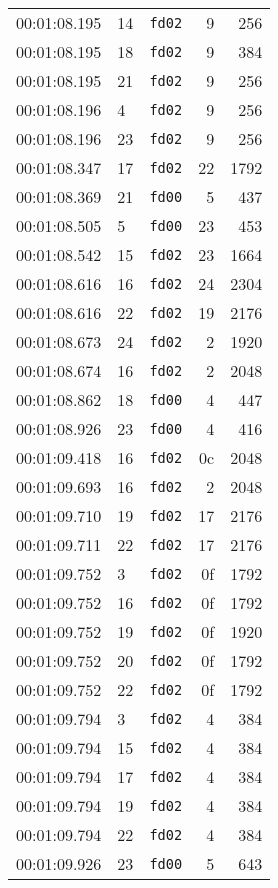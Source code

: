 \documentclass{article}
\begin{document}
\begin{longtable}{lllrr}
00:01:08.195 & 14 & \texttt{fd02} & 9 & 256 \\
00:01:08.195 & 18 & \texttt{fd02} & 9 & 384 \\
00:01:08.195 & 21 & \texttt{fd02} & 9 & 256 \\
00:01:08.196 & 4 & \texttt{fd02} & 9 & 256 \\
00:01:08.196 & 23 & \texttt{fd02} & 9 & 256 \\
00:01:08.347 & 17 & \texttt{fd02} & 22 & 1792 \\
00:01:08.369 & 21 & \texttt{fd00} & 5 & 437 \\
00:01:08.505 & 5 & \texttt{fd00} & 23 & 453 \\
00:01:08.542 & 15 & \texttt{fd02} & 23 & 1664 \\
00:01:08.616 & 16 & \texttt{fd02} & 24 & 2304 \\
00:01:08.616 & 22 & \texttt{fd02} & 19 & 2176 \\
00:01:08.673 & 24 & \texttt{fd02} & 2 & 1920 \\
00:01:08.674 & 16 & \texttt{fd02} & 2 & 2048 \\
00:01:08.862 & 18 & \texttt{fd00} & 4 & 447 \\
00:01:08.926 & 23 & \texttt{fd00} & 4 & 416 \\
00:01:09.418 & 16 & \texttt{fd02} & 0c & 2048 \\
00:01:09.693 & 16 & \texttt{fd02} & 2 & 2048 \\
00:01:09.710 & 19 & \texttt{fd02} & 17 & 2176 \\
00:01:09.711 & 22 & \texttt{fd02} & 17 & 2176 \\
00:01:09.752 & 3 & \texttt{fd02} & 0f & 1792 \\
00:01:09.752 & 16 & \texttt{fd02} & 0f & 1792 \\
00:01:09.752 & 19 & \texttt{fd02} & 0f & 1920 \\
00:01:09.752 & 20 & \texttt{fd02} & 0f & 1792 \\
00:01:09.752 & 22 & \texttt{fd02} & 0f & 1792 \\
00:01:09.794 & 3 & \texttt{fd02} & 4 & 384 \\
00:01:09.794 & 15 & \texttt{fd02} & 4 & 384 \\
00:01:09.794 & 17 & \texttt{fd02} & 4 & 384 \\
00:01:09.794 & 19 & \texttt{fd02} & 4 & 384 \\
00:01:09.794 & 22 & \texttt{fd02} & 4 & 384 \\
00:01:09.926 & 23 & \texttt{fd00} & 5 & 643 \\

\end{longtable}
\end{document}

